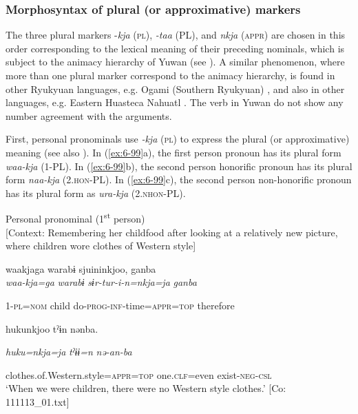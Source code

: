 \begin{table}
\subsubsection{Morphosyntax of plural (or approximative) markers}

The three plural markers -\textit{kja} (\textsc{pl}), \textit{-taa} (PL), and \textit{nkja} (\textsc{appr}) are chosen in this order corresponding to the lexical meaning of their preceding nominals, which is subject to the animacy hierarchy of Yuwan (see ). A similar phenomenon, where more than one plural marker correspond to the animacy hierarchy, is found in other Ryukyuan languages, e.g. Ogami (Southern Ryukyuan) \citep[133]{Pellard2010}, and also in other languages, e.g. Eastern Huasteca Nahuatl \citep[77-78]{Corbett2000}. The verb in Yuwan do not show any number agreement with the arguments.

First, personal pronominals use \textit{-kja} (\textsc{pl}) to express the plural (or approximative) meaning (see also ). In (\ref{ex:6-99}a), the first person pronoun has its plural form \textit{waa-kja} (1-PL). In (\ref{ex:6-99}b), the second person honorific pronoun has its plural form \textit{naa-kja} (2.\textsc{hon}-PL). In (\ref{ex:6-99}c), the second person non-honorific pronoun has its plural form as \textit{ura-kja} (2.\textsc{nhon}-PL).

\ea\label{ex:6-99}
 \ea Personal pronominal (1\textsuperscript{st} person)\\{}
[Context: Remembering her childfood after looking at a relatively new picture, where children wore clothes of Western style]

{\TM}
\glll waakjaga  warabɨ  sjuininkjoo,  ganba\\

      \textit{waa-kja=ga}  \textit{warabɨ}  \textit{sɨr-tur-i-n=nkja=ja}  \textit{ganba}

      1-\textsc{pl}=\textsc{nom}  child  do-\textsc{prog}-\textsc{inf}-time=\textsc{appr}=\textsc{top}  therefore

      hukunkjoo  tˀɨn  nənba.

      \textit{huku=nkja=ja}  \textit{tˀɨɨ=n}  \textit{nə-an-ba}

      clothes.of.Western.style=\textsc{appr}=\textsc{top}  one.\textsc{clf}=even  exist-\textsc{neg}-\textsc{csl}\\
\glt ‘When we were children, there were no Western style clothes.’ [Co: 111113\_01.txt]
\z


\end{table}
